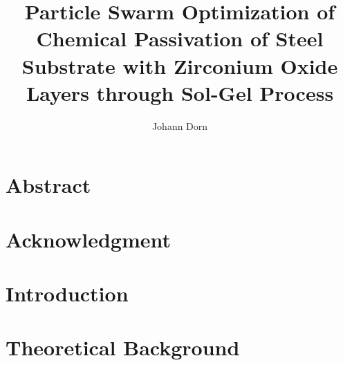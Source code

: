\documentclass[a4paper,twoside]{report}
\title{Particle Swarm Optimization of Chemical Passivation of Steel Substrate with Zirconium Oxide Layers through Sol-Gel Process}
\author{Johann Dorn}
\begin{document}



\chapter*{Abstract}


\chapter*{Acknowledgment}


\tableofcontents
\clearpage
\printglossaries
\clearpage

\chapter{Introduction}                                
\label{sec:intro}


%

\chapter{Theoretical Background}
\label{sec:theoretical}


%

\end{document}
